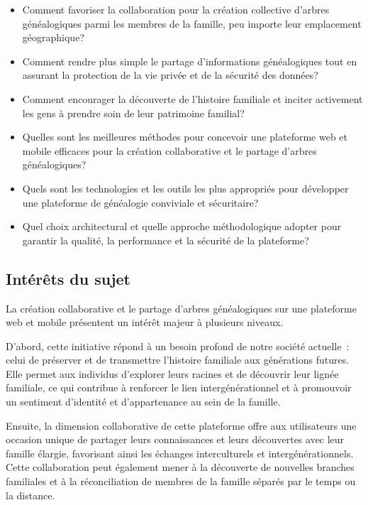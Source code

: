 \begin{itemize}
  \item Comment favoriser la collaboration pour la création collective d’arbres
    généalogiques parmi les membres de la famille, peu importe leur
    emplacement géographique?

  \item Comment rendre plus simple le partage d’informations généalogiques tout
    en assurant la protection de la vie privée et de la sécurité des données?

  \item Comment encourager la découverte de l’histoire familiale et inciter
    activement les gens à prendre soin de leur patrimoine familial?

  \item  Quelles sont les meilleures méthodes pour concevoir une plateforme web
    et mobile efficaces pour la création collaborative et le partage d’arbres
    généalogiques?

  \item Quels sont les technologies et les outils les plus appropriés pour
    développer une plateforme de généalogie conviviale et sécuritaire?

  \item Quel choix architectural et quelle approche méthodologique adopter pour
    garantir la qualité, la performance et la sécurité de la plateforme?

\end{itemize}

\subsection{Intérêts du sujet}
La création collaborative et le partage d’arbres généalogiques sur une plateforme
web et mobile présentent un intérêt majeur à plusieurs niveaux.

D'abord, cette initiative répond à un besoin profond de notre société actuelle :
celui de préserver et de transmettre l’histoire familiale aux générations futures.
Elle permet aux individus d’explorer leurs racines et de découvrir leur lignée
familiale, ce qui contribue à renforcer le lien intergénérationnel et à promouvoir
un sentiment d’identité et d’appartenance au sein de la famille.

Ensuite, la dimension collaborative de cette plateforme offre aux utilisateurs une
occasion unique de partager leurs connaissances et leurs découvertes avec leur famille
élargie, favorisant ainsi les échanges interculturels et intergénérationnels.
Cette collaboration peut également mener à la découverte de nouvelles branches
familiales et à la réconciliation de membres de la famille séparés par le temps ou la distance.

